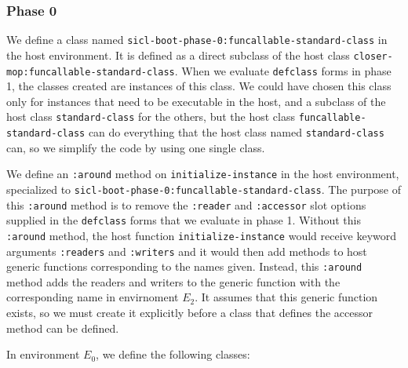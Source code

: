 \subsubsection{Phase 0}

We define a class named
\texttt{sicl-boot-phase-0:funcallable-standard-class} in the host
environment.  It is defined as a direct subclass of the host class
\texttt{closer-mop:funcallable-standard-class}.  When we
evaluate \texttt{defclass} forms in phase 1, the classes created are
instances of this class.  We could have chosen this class only for
instances that need to be executable in the host, and a subclass of
the host class \texttt{standard-class} for the others, but the host
class \texttt{funcallable-standard-class} can do everything that the
host class named \texttt{standard-class} can, so we simplify the code by
using one single class.

We define an \texttt{:around} method on \texttt{initialize-instance}
in the host environment, specialized to
\texttt{sicl-boot-phase-0:funcallable-standard-class}.  The purpose of
this \texttt{:around} method is to remove the \texttt{:reader} and
\texttt{:accessor} slot options supplied in the \texttt{defclass}
forms that we evaluate in phase 1.  Without this \texttt{:around}
method, the host function \texttt{initialize-instance} would receive
keyword arguments \texttt{:readers} and \texttt{:writers} and it would
then add methods to host generic functions corresponding to the names
given.  Instead, this \texttt{:around} method adds the readers and
writers to the generic function with the corresponding name in
envirnoment $E_2$.  It assumes that this generic function exists, so
we must create it explicitly before a class that defines the accessor
method can be defined.

In environment $E_0$, we define the following classes:

